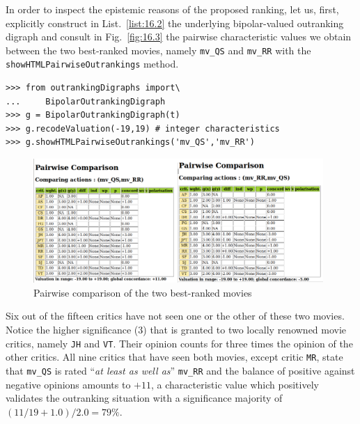 In order to inspect the epistemic reasons of the proposed ranking, let us, first, explicitly construct in List.~\vref{list:16.2} the underlying bipolar-valued outranking digraph and consult in Fig.~\vref{fig:16.3} the pairwise characteristic values we obtain between the two best-ranked movies, namely \texttt{mv\_QS} and \texttt{mv\_RR} with the \texttt{showHTMLPairwiseOutrankings} method.
\begin{lstlisting}[caption={Showing pairwise outrankings in a browser view},label=list:16.2]
>>> from outrankingDigraphs import\
...     BipolarOutrankingDigraph
>>> g = BipolarOutrankingDigraph(t)
>>> g.recodeValuation(-19,19) # integer characteristics
>>> g.showHTMLPairwiseOutrankings('mv_QS','mv_RR')
\end{lstlisting}
\begin{figure}[h]
\includegraphics[width=11cm]{Figures/graffiti07_45.png}
\caption{Pairwise comparison of the two best-ranked movies}
\label{fig:16.3}       %
\end{figure}

Six out of the fifteen critics have not seen one or the other of these two movies. Notice the higher significance ($3$) that is granted to two locally renowned movie critics, namely \texttt{JH} and \texttt{VT}. Their opinion counts for three times the opinion of the other critics. All nine critics that have seen both movies, except critic \texttt{MR}, state that \texttt{mv\_QS} is rated ``\emph{at least as well as}'' \texttt{mv\_RR} and the balance of positive against negative opinions amounts to $+11$, a characteristic value which positively validates the outranking situation with a significance majority of $(11/19 + 1.0) / 2.0 = 79\%$.

